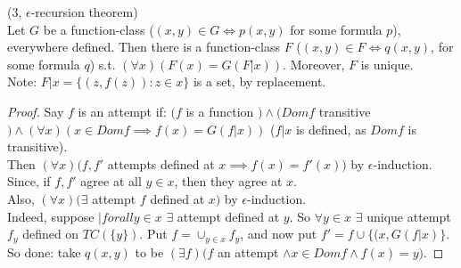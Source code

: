 \documentclass[a4paper]{article}
\begin{document}
\begin{thm} (3, $\epsilon$-recursion theorem)\\
Let $G$ be a function-class ($(x,y) \in G \iff p(x,y)$ for some formula $p$), everywhere defined. Then there is a function-class $F$ ($(x,y) \in F \iff q(x,y)$, for some formula $q$) s.t. $(\forall x) (F(x) = G(F|x))$. Moreover, $F$ is unique.\\
Note: $F|x = \{(z,f(z)): z \in x\}$ is a set, by replacement.
\begin{proof}
Say $f$ is an attempt if: $(f$ is a function $) \wedge (Dom f$ transitive $) \wedge (\forall x) (x \in Dom f \implies f(x) = G(f|x))$ ($f|x$ is defined, as $Dom f$ is transitive).\\
Then $(\forall x) (f,f'$ attempts defined at $x \implies f(x) = f'(x))$ by $\epsilon$-induction.\\
Since, if $f,f'$ agree at all $y \in x$, then they agree at $x$.\\
Also, $(\forall x) (\exists$ attempt $f$ defined at $x)$ by $\epsilon$-induction.\\
Indeed, suppose $|forall y \in x$ $\exists$ attempt defined at $y$. So $\forall y \in x$ $\exists$ unique attempt $f_y$ defined on $TC(\{y\})$. Put $f = \cup_{y \in x} f_y$, and now put $f' = f \cup \{(x,G(f|x)\}$. So done: take $q(x,y)$ to be $(\exists f) (f$ an attempt $\wedge x \in Dom f \wedge f(x) = y)$.
\end{proof}
\end{thm}

\iffalse
\begin{equation*}
\begin{aligned}

\end{aligned}
\end{equation*}
\fi
\end{document}
